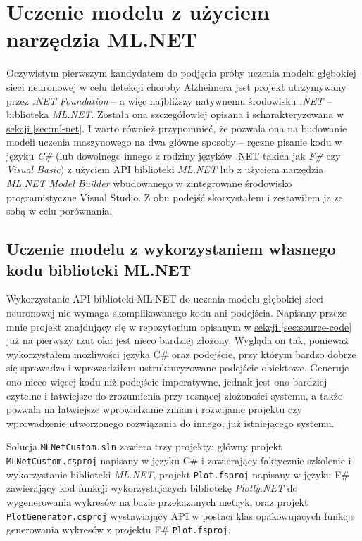 \section{Uczenie modelu z użyciem narzędzia ML.NET}

Oczywistym pierwszym kandydatem do podjęcia próby uczenia modelu głębokiej sieci neuronowej w celu detekcji choroby Alzheimera jest projekt utrzymywany przez \emph{.NET Foundation} -- a więc najbliższy natywnemu środowisku \emph{.NET} -- biblioteka \emph{ML.NET}.
Została ona szczegółowiej opisana i scharakteryzowana w \hyperref[sec:ml-net]{sekcji \ref*{sec:ml-net}}.
I warto również przypomnieć, że pozwala ona na budowanie modeli uczenia maszynowego na dwa główne sposoby -- ręczne pisanie kodu w języku \emph{C\#} (lub dowolnego innego z rodziny języków .NET takich jak \emph{F\#} czy \emph{Visual Basic}) z użyciem API biblioteki \emph{ML.NET} lub z użyciem narzędzia \emph{ML.NET Model Builder} wbudowanego w zintegrowane środowisko programistyczne Visual Studio.
Z obu podejść skorzystałem i zestawiłem je ze sobą w celu porównania.

\subsection{Uczenie modelu z wykorzystaniem własnego kodu biblioteki ML.NET}

Wykorzystanie API biblioteki ML.NET do uczenia modelu głębokiej sieci neuronowej nie wymaga skomplikowanego kodu ani podejścia.
Napisany przeze mnie projekt znajdujący się w repozytorium opisanym w \hyperref[sec:source-code]{sekcji \ref*{sec:source-code}} już na pierwszy rzut oka jest nieco bardziej złożony.
Wygląda on tak, ponieważ wykorzystałem możliwości języka C\# oraz podejście, przy którym bardzo dobrze się sprowadza i wprowadziłem ustrukturyzowane podejście obiektowe.
Generuje ono nieco więcej kodu niż podejście imperatywne, jednak jest ono bardziej czytelne i łatwiejsze do zrozumienia przy rosnącej złożoności systemu, a także pozwala na łatwiejsze wprowadzanie zmian i rozwijanie projektu czy wprowadzenie utworzonego rozwiązania do innego, już istniejącego systemu.

Solucja \lstinline{MLNetCustom.sln} zawiera trzy projekty: główny projekt \lstinline{MLNetCustom.csproj} napisany w języku C\# i zawierający faktycznie szkolenie i wykorzystanie biblioteki \emph{ML.NET}, projekt \lstinline{Plot.fsproj} napisany w języku F\# zawierający kod funkcji wykorzystujacych bibliotekę \emph{Plotly.NET} do wygenerowania wykresów na bazie przekazanych metryk, oraz projekt \lstinline{PlotGenerator.csproj} wystawiający API w postaci klas opakowujacych funkcje generowania wykresów z projektu F\# \lstinline{Plot.fsproj}.

